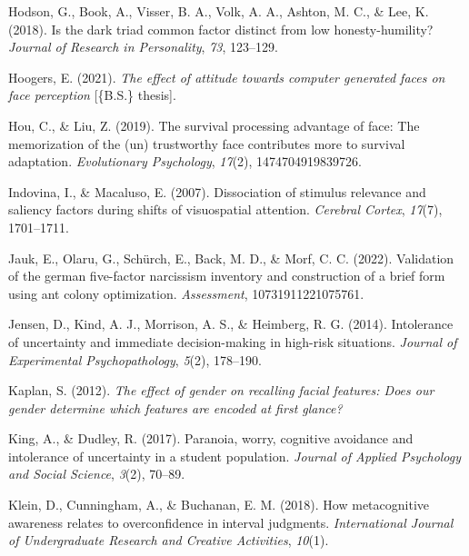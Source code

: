 \documentclass[
  man,floatsintext]{apa6}
\newlength{\cslhangindent}
\newlength{\cslentryspacingunit} %
\newenvironment{CSLReferences}[2] %
 {%
  \setlength{\parindent}{0pt}
  \ifodd #1
  \let\oldpar\par
  \def\par{\hangindent=\cslhangindent\oldpar}
  \fi
  \setlength{\parskip}{#2\cslentryspacingunit}
 }%
 {}
\begin{document}
\begin{CSLReferences}{1}{0}
\leavevmode{}%
Hodson, G., Book, A., Visser, B. A., Volk, A. A., Ashton, M. C., \& Lee, K. (2018). Is the dark triad common factor distinct from low honesty-humility? \emph{Journal of Research in Personality}, \emph{73}, 123--129.

\leavevmode{}%
Hoogers, E. (2021). \emph{The effect of attitude towards computer generated faces on face perception} {[}\{B.S.\} thesis{]}.

\leavevmode{}%
Hou, C., \& Liu, Z. (2019). The survival processing advantage of face: The memorization of the (un) trustworthy face contributes more to survival adaptation. \emph{Evolutionary Psychology}, \emph{17}(2), 1474704919839726.

\leavevmode{}%
Indovina, I., \& Macaluso, E. (2007). Dissociation of stimulus relevance and saliency factors during shifts of visuospatial attention. \emph{Cerebral Cortex}, \emph{17}(7), 1701--1711.

\leavevmode{}%
Jauk, E., Olaru, G., Schürch, E., Back, M. D., \& Morf, C. C. (2022). Validation of the german five-factor narcissism inventory and construction of a brief form using ant colony optimization. \emph{Assessment}, 10731911221075761.

\leavevmode{}%
Jensen, D., Kind, A. J., Morrison, A. S., \& Heimberg, R. G. (2014). Intolerance of uncertainty and immediate decision-making in high-risk situations. \emph{Journal of Experimental Psychopathology}, \emph{5}(2), 178--190.

\leavevmode{}%
Kaplan, S. (2012). \emph{The effect of gender on recalling facial features: Does our gender determine which features are encoded at first glance?}

\leavevmode{}%
King, A., \& Dudley, R. (2017). Paranoia, worry, cognitive avoidance and intolerance of uncertainty in a student population. \emph{Journal of Applied Psychology and Social Science}, \emph{3}(2), 70--89.

\leavevmode{}%
Klein, D., Cunningham, A., \& Buchanan, E. M. (2018). How metacognitive awareness relates to overconfidence in interval judgments. \emph{International Journal of Undergraduate Research and Creative Activities}, \emph{10}(1).


\end{CSLReferences}
\end{document}
